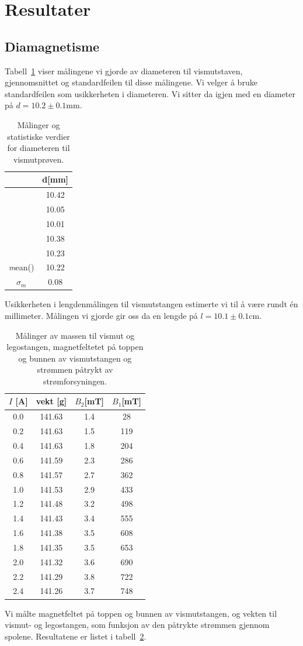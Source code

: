 \documentclass[a4paper,11pt, twocolumn]{article}
\begin{document}
\section{Resultater}

\subsection{Diamagnetisme}
Tabell~\ref{tab:diameterVismut} viser målingene vi gjorde av diameteren til vismutstaven, gjennomsnittet og standardfeilen til disse målingene. Vi velger å bruke standardfeilen som usikkerheten i diameteren. Vi sitter da igjen med en diameter på $d = 10.2\pm0.1$mm.
\begin{table}[!ht]
	\centering
	\caption{Målinger og statistiske verdier for diameteren til vismutprøven.}
	\begin{tabular}{cc}
		\toprule
		\toprule
		& d[mm]\\
		\toprule
		&10.42\\ 
		&10.05\\
		&10.01\\
		&10.38\\
		&10.23\\
		\toprule
		{\textit mean()}& 10.22\\
		$\sigma_m$ & 0.08\\
		\toprule
	\end{tabular}
	\label{tab:diameterVismut}
\end{table}
Usikkerheten i lengdenmålingen til vismutstangen estimerte vi til å være rundt \'en millimeter. Målingen vi gjorde gir oss da en lengde på $l = 10.1\pm0.1$cm.
\begin{table}
	\centering	
	\caption{Målinger av massen til vismut og legostangen, magnetfeltetet på toppen og bunnen av vismutstangen og strømmen påtrykt av strømforsyningen.}
	\begin{tabular}{cccc}
		\toprule
		\toprule
		$I$ [A] & vekt [g] & $B_2$[mT] & $B_1$[mT]\\
		\toprule
		0.0&	141.63&	1.4&	28 \\ 
		0.2&	141.63&	1.5&	119\\
		0.4&	141.63&	1.8&	204\\
		0.6&	141.59&	2.3&	286\\
		0.8&	141.57&	2.7&	362\\
		1.0&	141.53&	2.9&	433\\
		1.2&	141.48&	3.2&	498\\
		1.4&	141.43&	3.4&	555\\
		1.6&	141.38&	3.5&	608\\
		1.8&	141.35&	3.5&	653\\
		2.0&	141.32&	3.6&	690\\
		2.2&	141.29&	3.8&	722\\
		2.4&	141.26&	3.7&	748\\
		\toprule
	\end{tabular}
	\label{tab:measurements}
\end{table}
Vi målte magnetfeltet på toppen og bunnen av vismutstangen, og vekten til vismut- og legostangen, som funksjon av den påtrykte strømmen gjennom spolene. Resultatene er listet i tabell~\ref{tab:measurements}.
\end{document}
